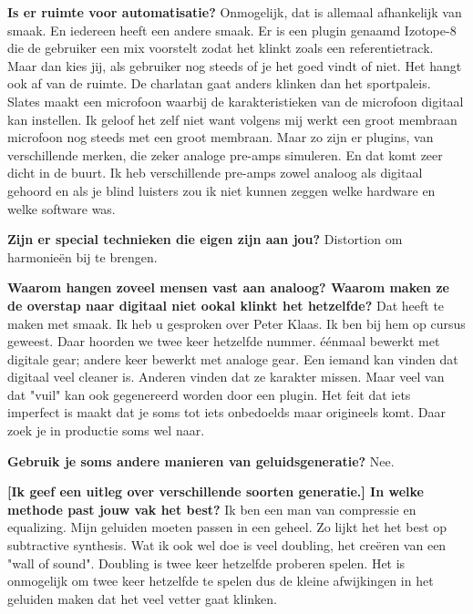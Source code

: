 \textbf{Is er ruimte voor automatisatie?}\newline
Onmogelijk, dat is allemaal afhankelijk van smaak. En iedereen heeft een andere smaak. Er is een plugin genaamd Izotope-8 die de gebruiker een mix voorstelt zodat het klinkt zoals een referentietrack. Maar dan kies jij, als gebruiker nog steeds of je het goed vindt of niet.
Het hangt ook af van de ruimte. De charlatan gaat anders klinken dan het sportpaleis.
Slates maakt een microfoon waarbij de karakteristieken van de microfoon digitaal kan instellen. Ik geloof het zelf niet want volgens mij werkt een groot membraan microfoon nog steeds met een groot membraan. Maar zo zijn er plugins, van verschillende merken, die zeker analoge pre-amps simuleren. En dat komt zeer dicht in de buurt.
Ik heb verschillende pre-amps zowel analoog als digitaal gehoord en als je blind luisters zou ik niet kunnen zeggen welke hardware en welke software was.

\textbf{Zijn er special technieken die eigen zijn aan jou?}\newline
Distortion om harmonieën bij te brengen.

\textbf{Waarom hangen zoveel mensen vast aan analoog? Waarom maken ze de overstap naar digitaal niet ookal klinkt het hetzelfde?}\newline
Dat heeft te maken met smaak. Ik heb u gesproken over Peter Klaas. Ik ben bij hem op cursus geweest. Daar hoorden we twee keer hetzelfde nummer. éénmaal bewerkt met digitale gear; andere keer bewerkt met analoge gear.
Een iemand kan vinden dat digitaal veel cleaner is. Anderen vinden dat ze karakter missen. Maar veel van dat "vuil" kan ook gegenereerd worden door een plugin.
Het feit dat iets imperfect is maakt dat je soms tot iets onbedoelds maar origineels komt. Daar zoek je in productie soms wel naar.

\textbf{Gebruik je soms andere manieren van geluidsgeneratie?}\newline
Nee.

\textbf{[Ik geef een uitleg over verschillende soorten generatie.]\newline
In welke methode past jouw vak het best?}\newline
Ik ben een man van compressie en equalizing. Mijn geluiden moeten passen in een geheel. Zo lijkt het het best op subtractive synthesis.
Wat ik ook wel doe is veel doubling, het creëren van een "wall of sound". Doubling is twee keer hetzelfde proberen spelen. Het is onmogelijk om twee keer hetzelfde te spelen dus de kleine afwijkingen in het geluiden maken dat het veel vetter gaat klinken.

